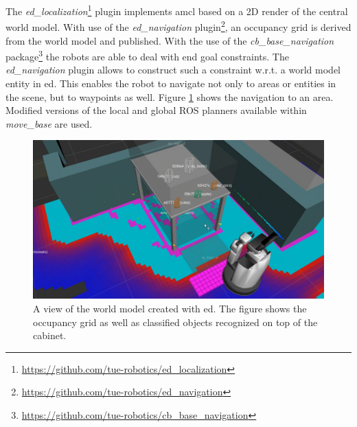 The \emph{ed\_localization}\footnote{\url{https://github.com/tue-robotics/ed_localization}} plugin implements \acrshort{amcl} based on a 2D render of the central world model. With use of the \emph{ed\_navigation} plugin\footnote{\url{https://github.com/tue-robotics/ed_navigation}}, an occupancy grid is derived from the world model and published. With the use of the \emph{cb\_base\_navigation} package\footnote{\url{https://github.com/tue-robotics/cb_base_navigation}} the robots are able to deal with end goal constraints. The \emph{ed\_navigation} plugin allows to construct such a constraint w.r.t. a world model entity in \acrshort{ed}. This enables the robot to navigate not only to areas or entities in the scene, but to waypoints as well. Figure \ref{fig:ed_segmentation} shows the navigation to an area.
Modified versions of the local and global ROS planners available within \emph{move\_base} are used.
\begin{figure}[H]
	\centering
	\includegraphics[width = 0.7\linewidth]{Figures/ed_segmentation_hsr}
	\caption{A view of the world model created with \acrshort{ed}. The figure shows the occupancy grid as well as classified objects recognized on top of the cabinet.}
	\label{fig:ed_segmentation}
\end{figure}
